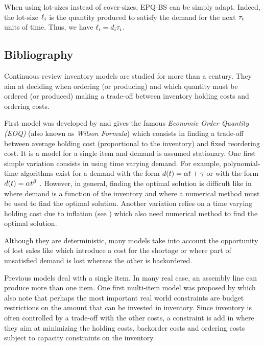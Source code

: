 \medskip


When using lot-sizes instead of cover-sizes, EPQ-BS can be simply adapt.
Indeed, the lot-size $\ell_i$ is the quantity produced to satisfy the demand for the next $\tau_i$ units of time.
Thus, we have $\ell_i=d_i\tau_i$.


\subsection{Bibliography}


Continuous review inventory models are studied for more than a century.
They aim at deciding when ordering (or producing) and which quantity must be ordered (or produced) making a trade-off between inventory holding costs and ordering costs.


First model was developed by \cite{Harris1913} and gives the famous \emph{Economic Order Quantity (EOQ)} (also known as \emph{Wilson Formula}) which consists in finding a trade-off between average holding cost (proportional to the inventory) and fixed reordering cost.
It is a model for a single item and demand is assumed stationary.
One first simple variation consists in using time varying demand.
For example, polynomial-time algorithms exist for a demand with the form $d(t)=\alpha t+\gamma$ \cite{Resh1976,Donaldson1977} or with the form $d(t)=\alpha t^{\beta}$ \cite{Barbosa1978}.
However, in general, finding the optimal solution is difficult like in \cite{Padmanabhan1990} where demand is a function of the inventory and where a numerical method must be used to find the optimal solution.
Another variation relies on a time varying holding cost due to inflation (see \cite{Vrat1990}) which also need numerical method to find the optimal solution.


Although they are deterministic, many models take into account the opportunity of lost sales like \cite{Salameh2003} which introduce a cost for the shortage or \cite{Park1982} where part of unsatisfied demand is lost whereas the other is backordered.


\medskip


Previous models deal with a single item.
In many real case, an assembly line can produce more than one item.
One first multi-item model was proposed by \cite{Hadley1963} which also note that perhaps the most important real world constraints are budget restrictions on the amount that can be invested in inventory.
Since inventory is often controlled by a trade-off with the other costs, a constraint is add in \cite{Ohno2001} where they aim at minimizing the holding costs, backorder costs and ordering costs subject to capacity constraints on the inventory.



